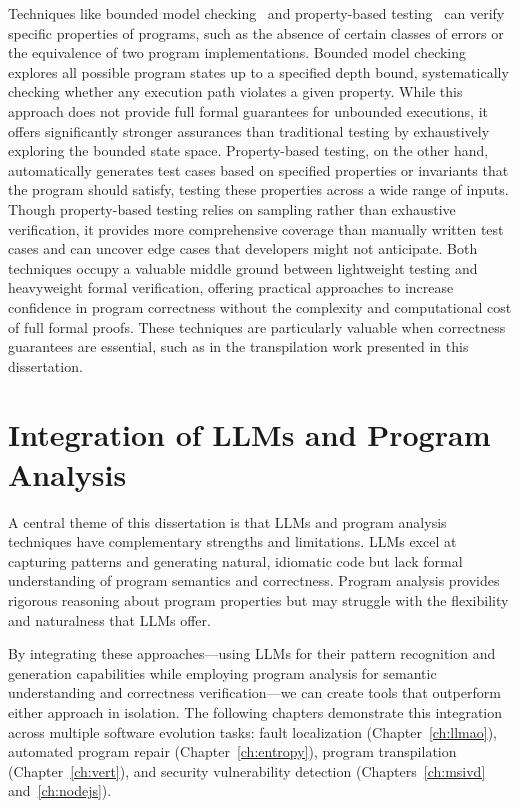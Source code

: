 \documentclass[12pt,openany,oneside,table]{cmuthesis}
\begin{document}
Techniques like bounded model checking~\cite{clarke2001bounded, DBLP:conf/tacas/ClarkeKL04} and property-based testing~\cite{fink1997property} can verify specific properties of programs, such as the absence of certain classes of errors or the equivalence of two program implementations. Bounded model checking explores all possible program states up to a specified depth bound, systematically checking whether any execution path violates a given property. While this approach does not provide full formal guarantees for unbounded executions, it offers significantly stronger assurances than traditional testing by exhaustively exploring the bounded state space. Property-based testing, on the other hand, automatically generates test cases based on specified properties or invariants that the program should satisfy, testing these properties across a wide range of inputs. Though property-based testing relies on sampling rather than exhaustive verification, it provides more comprehensive coverage than manually written test cases and can uncover edge cases that developers might not anticipate. Both techniques occupy a valuable middle ground between lightweight testing and heavyweight formal verification, offering practical approaches to increase confidence in program correctness without the complexity and computational cost of full formal proofs. These techniques are particularly valuable when correctness guarantees are essential, such as in the transpilation work presented in this dissertation.

\section{Integration of LLMs and Program Analysis}

A central theme of this dissertation is that LLMs and program analysis techniques have complementary strengths and limitations. LLMs excel at capturing patterns and generating natural, idiomatic code but lack formal understanding of program semantics and correctness. Program analysis provides rigorous reasoning about program properties but may struggle with the flexibility and naturalness that LLMs offer.

By integrating these approaches—using LLMs for their pattern recognition and generation capabilities while employing program analysis for semantic understanding and correctness verification—we can create tools that outperform either approach in isolation. The following chapters demonstrate this integration across multiple software evolution tasks: fault localization (Chapter~\ref{ch:llmao}), automated program repair (Chapter~\ref{ch:entropy}), program transpilation (Chapter~\ref{ch:vert}), and security vulnerability detection (Chapters~\ref{ch:msivd} and~\ref{ch:nodejs}). 
\end{document}
